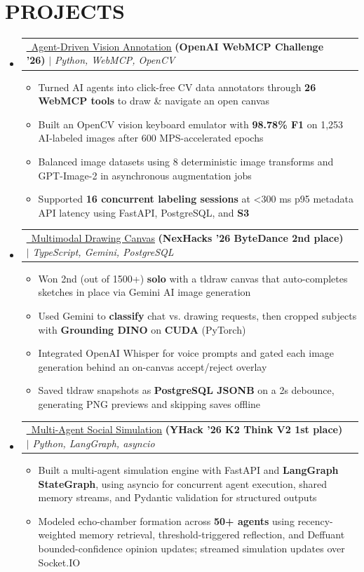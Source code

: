 \documentclass[letterpaper,11pt]{article}
\makeatletter
\newcommand{\resumeItem}[1]{
  \item\small{
    {#1 \vspace{-4pt}}
  }
}
\newcommand{\resumeProjectHeading}[2]{
    \item
    \begin{tabular*}{0.97\textwidth}[t]{l@{\extracolsep{\fill}}r}
      #1 & #2 \\
    \end{tabular*}\vspace{-7pt}
}
\newcommand{\resumeSubHeadingListStart}{\begin{itemize}[leftmargin=0.15in, label={}]}
\newcommand{\resumeSubHeadingListEnd}{\end{itemize}}
\newcommand{\resumeItemListStart}{\begin{itemize}[itemsep=4.5pt]}
\newcommand{\resumeItemListEnd}{\end{itemize}\vspace{-6pt}}
\makeatother
\begin{document}
\section{\textbf{PROJECTS}}
    \resumeSubHeadingListStart
    \resumeProjectHeading
  {\href{https://github.com/0xABAN/YADL}{\textcolor{linkblue}{\underline{\faGithub\ Agent-Driven Vision Annotation}}} \textbf{(OpenAI WebMCP Challenge '26)}
  $|$
  \emph{Python, WebMCP, OpenCV}
  }
  {}
  \resumeItemListStart
    \resumeItem{Turned AI agents into click-free CV data annotators through \textbf{26 WebMCP tools} to draw \& navigate an open canvas}
    \resumeItem{Built an OpenCV vision keyboard emulator with \textbf{98.78\% F1} on 1,253 AI-labeled images after 600 MPS-accelerated epochs}
    \resumeItem{Balanced image datasets using 8 deterministic image transforms and GPT-Image-2 in asynchronous augmentation jobs}
    \resumeItem{Supported \textbf{16 concurrent labeling sessions} at \textless{}300 ms p95 metadata API latency using FastAPI, PostgreSQL, and \textbf{S3}}
  \resumeItemListEnd
    \resumeProjectHeading
  {\href{https://github.com/AdamPSU/maestro}{\textcolor{linkblue}{\underline{\faGithub\ Multimodal Drawing Canvas}}} \textbf{(NexHacks '26 ByteDance 2nd place)}
  $|$
  \emph{TypeScript, Gemini, PostgreSQL}
  }
  {}
  \resumeItemListStart
    \resumeItem{Won 2nd (out of 1500+) \textbf{solo} with a tldraw canvas that auto-completes sketches in place via Gemini AI image generation}
    \resumeItem{Used Gemini to \textbf{classify} chat vs. drawing requests, then cropped subjects with \textbf{Grounding DINO} on \textbf{CUDA} (PyTorch)}
    \resumeItem{Integrated OpenAI Whisper for voice prompts and gated each image generation behind an on-canvas accept/reject overlay}
    \resumeItem{Saved tldraw snapshots as \textbf{PostgreSQL JSONB} on a 2s debounce, generating PNG previews and skipping saves offline}
  \resumeItemListEnd
     \resumeProjectHeading
  {\href{https://github.com/AdamPSU/simulacra}{\textcolor{linkblue}{\underline{\faGithub\ Multi-Agent Social Simulation}}} \textbf{(YHack '26 K2 Think V2 1st place)}
  $|$
  \emph{Python, LangGraph, asyncio}
  }{}
  \resumeItemListStart
    \resumeItem{Built a multi-agent simulation engine with FastAPI and \textbf{LangGraph StateGraph}, using asyncio for concurrent agent execution, shared memory streams, and Pydantic validation for structured outputs}
    \resumeItem{Modeled echo-chamber formation across \textbf{50+ agents} using recency-weighted memory retrieval, threshold-triggered reflection, and Deffuant bounded-confidence opinion updates; streamed simulation updates over Socket.IO}
  \resumeItemListEnd
    \resumeSubHeadingListEnd
\end{document}
